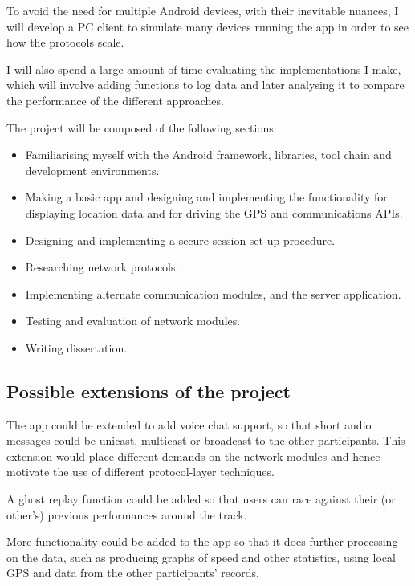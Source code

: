 \documentclass[12pt,twoside,notitlepage]{report}
\begin{document}
To avoid the need for multiple Android devices, with their inevitable nuances, I will develop a PC client to simulate many devices running the app in order to see how the protocols scale.

I will also spend a large amount of time evaluating the implementations I make, which will involve adding functions to log data and later analysing it to compare the performance of the different approaches.

The project will be composed of the following sections:

\begin{itemize}

\item{Familiarising myself with the Android framework, libraries, tool chain and development environments.}
\item{Making a basic app and designing and implementing the functionality for displaying location data and for driving the GPS and communications APIs.}
\item{Designing and implementing a secure session set-up procedure.}
\item{Researching network protocols.}
\item{Implementing alternate communication modules, and the server application.}
\item{Testing and evaluation of network modules.}
\item{Writing dissertation.}

\end{itemize}

\subsection*{Possible extensions of the project}

The app could be extended to add voice chat support, so that short audio messages could be unicast, multicast or broadcast to the other participants.  This extension would place different demands on the network modules and hence motivate the use of different protocol-layer techniques.


A ghost replay function could be added so that users can race against their (or other's) previous performances around the track.

More functionality could be added to the app so that it does further processing on the data, such as producing graphs of speed and other statistics, using local GPS and data from the other participants' records.
\end{document}
